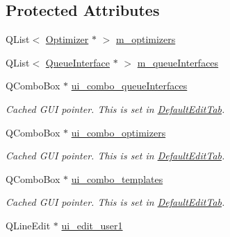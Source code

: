 \subsection*{Protected Attributes}
\begin{DoxyCompactItemize}
\item 
Q\-List$<$ \hyperlink{classGlobalSearch_1_1Optimizer}{Optimizer} $\ast$ $>$ \hyperlink{classGlobalSearch_1_1AbstractEditTab_a91f1cbcdf3321b4502aaa11074559eba}{m\-\_\-optimizers}
\item 
Q\-List$<$ \hyperlink{classGlobalSearch_1_1QueueInterface}{Queue\-Interface} $\ast$ $>$ \hyperlink{classGlobalSearch_1_1AbstractEditTab_a364845072bfc0409a145c1cd6b60a60a}{m\-\_\-queue\-Interfaces}
\item 
\hypertarget{classGlobalSearch_1_1AbstractEditTab_af8be46a29c5959f04b5686cf2b222245}{Q\-Combo\-Box $\ast$ \hyperlink{classGlobalSearch_1_1AbstractEditTab_af8be46a29c5959f04b5686cf2b222245}{ui\-\_\-combo\-\_\-queue\-Interfaces}}\label{classGlobalSearch_1_1AbstractEditTab_af8be46a29c5959f04b5686cf2b222245}

\begin{DoxyCompactList}\small\item\em Cached G\-U\-I pointer. This is set in \hyperlink{classGlobalSearch_1_1DefaultEditTab}{Default\-Edit\-Tab}. \end{DoxyCompactList}\item 
\hypertarget{classGlobalSearch_1_1AbstractEditTab_a8145b8270f711300f397d39bfd9e54c4}{Q\-Combo\-Box $\ast$ \hyperlink{classGlobalSearch_1_1AbstractEditTab_a8145b8270f711300f397d39bfd9e54c4}{ui\-\_\-combo\-\_\-optimizers}}\label{classGlobalSearch_1_1AbstractEditTab_a8145b8270f711300f397d39bfd9e54c4}

\begin{DoxyCompactList}\small\item\em Cached G\-U\-I pointer. This is set in \hyperlink{classGlobalSearch_1_1DefaultEditTab}{Default\-Edit\-Tab}. \end{DoxyCompactList}\item 
\hypertarget{classGlobalSearch_1_1AbstractEditTab_afb3ed174abbd52491c89a76a7d749148}{Q\-Combo\-Box $\ast$ \hyperlink{classGlobalSearch_1_1AbstractEditTab_afb3ed174abbd52491c89a76a7d749148}{ui\-\_\-combo\-\_\-templates}}\label{classGlobalSearch_1_1AbstractEditTab_afb3ed174abbd52491c89a76a7d749148}

\begin{DoxyCompactList}\small\item\em Cached G\-U\-I pointer. This is set in \hyperlink{classGlobalSearch_1_1DefaultEditTab}{Default\-Edit\-Tab}. \end{DoxyCompactList}\item 
\hypertarget{classGlobalSearch_1_1AbstractEditTab_a5d584e064980b7b67f48d91b9236401d}{Q\-Line\-Edit $\ast$ \hyperlink{classGlobalSearch_1_1AbstractEditTab_a5d584e064980b7b67f48d91b9236401d}{ui\-\_\-edit\-\_\-user1}}\label{classGlobalSearch_1_1AbstractEditTab_a5d584e064980b7b67f48d91b9236401d}


\end{DoxyCompactItemize}
